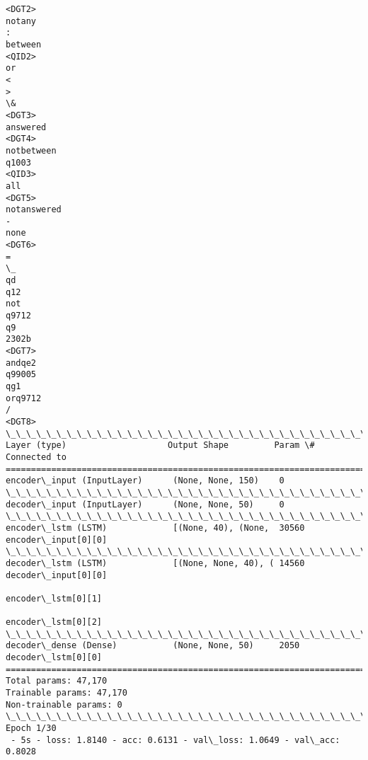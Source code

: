 \documentclass[11pt]{article}
\begin{document}
\begin{Verbatim}[commandchars=\\\{\}]
<DGT2>
notany
:
between
<QID2>
or
<
>
\&
<DGT3>
answered
<DGT4>
notbetween
q1003
<QID3>
all
<DGT5>
notanswered
-
none
<DGT6>
=
\_
qd
q12
not
q9712
q9
2302b
<DGT7>
andqe2
q99005
qg1
orq9712
/
<DGT8>
\_\_\_\_\_\_\_\_\_\_\_\_\_\_\_\_\_\_\_\_\_\_\_\_\_\_\_\_\_\_\_\_\_\_\_\_\_\_\_\_\_\_\_\_\_\_\_\_\_\_\_\_\_\_\_\_\_\_\_\_\_\_\_\_\_\_\_\_\_\_\_\_\_\_\_\_\_\_\_\_\_\_\_\_\_\_\_\_\_\_\_\_\_\_\_\_\_\_
Layer (type)                    Output Shape         Param \#     Connected to                     
==================================================================================================
encoder\_input (InputLayer)      (None, None, 150)    0                                            
\_\_\_\_\_\_\_\_\_\_\_\_\_\_\_\_\_\_\_\_\_\_\_\_\_\_\_\_\_\_\_\_\_\_\_\_\_\_\_\_\_\_\_\_\_\_\_\_\_\_\_\_\_\_\_\_\_\_\_\_\_\_\_\_\_\_\_\_\_\_\_\_\_\_\_\_\_\_\_\_\_\_\_\_\_\_\_\_\_\_\_\_\_\_\_\_\_\_
decoder\_input (InputLayer)      (None, None, 50)     0                                            
\_\_\_\_\_\_\_\_\_\_\_\_\_\_\_\_\_\_\_\_\_\_\_\_\_\_\_\_\_\_\_\_\_\_\_\_\_\_\_\_\_\_\_\_\_\_\_\_\_\_\_\_\_\_\_\_\_\_\_\_\_\_\_\_\_\_\_\_\_\_\_\_\_\_\_\_\_\_\_\_\_\_\_\_\_\_\_\_\_\_\_\_\_\_\_\_\_\_
encoder\_lstm (LSTM)             [(None, 40), (None,  30560       encoder\_input[0][0]              
\_\_\_\_\_\_\_\_\_\_\_\_\_\_\_\_\_\_\_\_\_\_\_\_\_\_\_\_\_\_\_\_\_\_\_\_\_\_\_\_\_\_\_\_\_\_\_\_\_\_\_\_\_\_\_\_\_\_\_\_\_\_\_\_\_\_\_\_\_\_\_\_\_\_\_\_\_\_\_\_\_\_\_\_\_\_\_\_\_\_\_\_\_\_\_\_\_\_
decoder\_lstm (LSTM)             [(None, None, 40), ( 14560       decoder\_input[0][0]              
                                                                 encoder\_lstm[0][1]               
                                                                 encoder\_lstm[0][2]               
\_\_\_\_\_\_\_\_\_\_\_\_\_\_\_\_\_\_\_\_\_\_\_\_\_\_\_\_\_\_\_\_\_\_\_\_\_\_\_\_\_\_\_\_\_\_\_\_\_\_\_\_\_\_\_\_\_\_\_\_\_\_\_\_\_\_\_\_\_\_\_\_\_\_\_\_\_\_\_\_\_\_\_\_\_\_\_\_\_\_\_\_\_\_\_\_\_\_
decoder\_dense (Dense)           (None, None, 50)     2050        decoder\_lstm[0][0]               
==================================================================================================
Total params: 47,170
Trainable params: 47,170
Non-trainable params: 0
\_\_\_\_\_\_\_\_\_\_\_\_\_\_\_\_\_\_\_\_\_\_\_\_\_\_\_\_\_\_\_\_\_\_\_\_\_\_\_\_\_\_\_\_\_\_\_\_\_\_\_\_\_\_\_\_\_\_\_\_\_\_\_\_\_\_\_\_\_\_\_\_\_\_\_\_\_\_\_\_\_\_\_\_\_\_\_\_\_\_\_\_\_\_\_\_\_\_
Epoch 1/30
 - 5s - loss: 1.8140 - acc: 0.6131 - val\_loss: 1.0649 - val\_acc: 0.8028

    \end{Verbatim}
\end{document}
